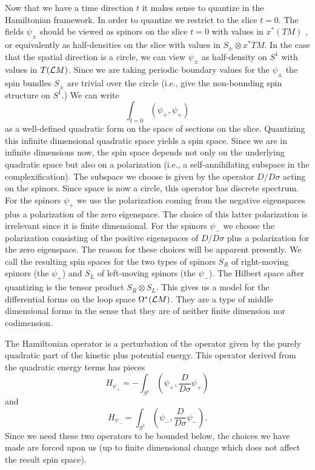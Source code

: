 Now that we have a time direction $t$ it makes sense to quantize in
the Hamiltonian framework.
In order to quantize we restrict to the  slice   $t=0$.
The fields $\psi_\pm$ should be viewed as spinors on the slice $t=0$ with
values in $x^*(TM)$ , or equivalently as half-densities on the slice 
with values in $S_\pm\otimes x^*TM$.
In the case that the spatial direction is a circle, we can view
$\psi_\pm$ as half-density on $S^1$ with values in  $T({\cal L}M)$.
Since we are taking periodic boundary values for the $\psi_\pm$
the spin bundles $S_\pm$  are trivial over the circle (i.e., give the
non-bounding spin structure on $S^1$.)
We can write
$$\int_{t=0}(\psi_+,\psi_+)$$ as a well-defined quadratic form on
the space of sections on the slice. Quantizing this infinite
dimensional quadratic space yields a spin space. Since we are in infinite
dimensions now, the spin space depends not only on the underlying
quadratic space but also on a polarization (i.e., a self-annihilating
subspace in the complexification). The subspace we choose is given by
the operator $D/D\sigma$ 
acting on  the spinors. Since space is now a circle, this operator has
discrete spectrum. For the spinors $\psi_+$ we use the
polarization coming from the negative eigenspaces plus a polarization
of the zero eigenspace. The choice of this latter polarization is
irrelevant since it is finite dimensional.
For the spinors $\psi_-$ we choose the polarization consisting
of the positive eigenspaces of $D/D\sigma$ plus a polarization for the
zero eigenspace. The reason for these choices will be apparent presently.
We call the resulting spin spaces for the two types of spinors $S_R$
of right-moving spinors (the $\psi_+$) and $S_L$ of left-moving
spinors (the $\psi_-$).
The Hilbert space after quantizing is
the tensor product 
$S_R\otimes S_L$.
This gives us a model for the differential
forms on the loop space $\Omega^*({\cal L}M)$. They are a type of
middle dimensional forms in the sense that they are of neither finite
dimension nor codimension.




The Hamiltonian operator is a perturbation of the
operator given by the purely quadratic part of the kinetic plus
potential energy.
This operator derived from the quadratic energy terms has pieces
$$H_{\psi_+}=-\int_{S^1}(\psi_+,\frac{D}{D\sigma}\psi_+)$$
and
$$H_{\psi_-}=\int_{S^1}(\psi_-,\frac{D}{D\sigma}\psi_-).$$
Since we need these  two operators to be bounded below, 
the choices we have made are forced upon us (up to finite dimensional
change which does not affect the result spin space).


